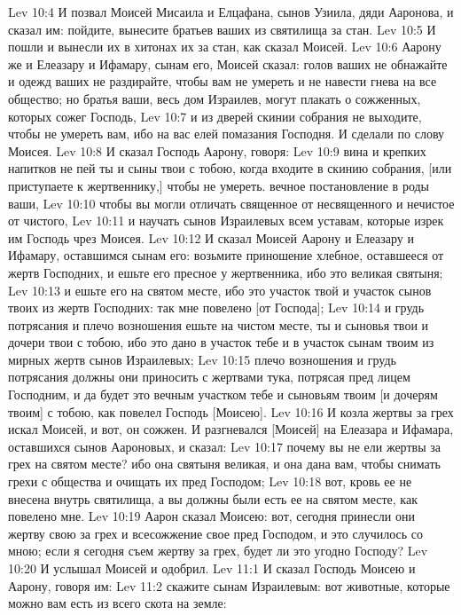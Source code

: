 \vs Lev 10:4 И позвал Моисей Мисаила и Елцафана, сынов Узиила, дяди Ааронова, и сказал им: пойдите, вынесите братьев ваших из святилища за стан.
\vs Lev 10:5 И пошли и вынесли их в хитонах их за стан, как сказал Моисей.
\vs Lev 10:6 Аарону же и Елеазару и Ифамару, сынам его, Моисей сказал: голов ваших не обнажайте и одежд ваших не раздирайте, чтобы вам не умереть и не навести гнева на все общество; но братья ваши, весь дом Израилев, могут плакать о сожженных, которых сожег Господь,
\vs Lev 10:7 и из дверей скинии собрания не выходите, чтобы не умереть вам, ибо на вас елей помазания Господня. И сделали по слову Моисея.
\rsbpar\vs Lev 10:8 И сказал Господь Аарону, говоря:
\vs Lev 10:9 вина и крепких напитков не пей ты и сыны твои с тобою, когда входите в скинию собрания, [или приступаете к жертвеннику,] чтобы не умереть.  вечное постановление в роды ваши,
\vs Lev 10:10 чтобы вы могли отличать священное от несвященного и нечистое от чистого,
\vs Lev 10:11 и научать сынов Израилевых всем уставам, которые изрек им Господь чрез Моисея.
\rsbpar\vs Lev 10:12 И сказал Моисей Аарону и Елеазару и Ифамару, оставшимся сынам его: возьмите приношение хлебное, оставшееся от жертв Господних, и ешьте его пресное у жертвенника, ибо это великая святыня;
\vs Lev 10:13 и ешьте его на святом месте, ибо это участок твой и участок сынов твоих из жертв Господних: так мне повелено [от Господа];
\vs Lev 10:14 и грудь потрясания и плечо возношения ешьте на чистом месте, ты и сыновья твои и дочери твои с тобою, ибо это дано в участок тебе и в участок сынам твоим из мирных жертв сынов Израилевых;
\vs Lev 10:15 плечо возношения и грудь потрясания должны они приносить с жертвами тука, потрясая пред лицем Господним, и да будет это вечным участком тебе и сыновьям твоим [и дочерям твоим] с тобою, как повелел Господь [Моисею].
\vs Lev 10:16 И козла жертвы за грех искал Моисей, и вот, он сожжен. И разгневался [Моисей] на Елеазара и Ифамара, оставшихся сынов Аароновых, и сказал:
\vs Lev 10:17 почему вы не ели жертвы за грех на святом месте? ибо она святыня великая, и она дана вам, чтобы снимать грехи с общества и очищать их пред Господом;
\vs Lev 10:18 вот, кровь ее не внесена внутрь святилища, а вы должны были есть ее на святом месте, как повелено мне.
\vs Lev 10:19 Аарон сказал Моисею: вот, сегодня принесли они жертву свою за грех и всесожжение свое пред Господом, и это случилось со мною; если я сегодня съем жертву за грех, будет ли это угодно Господу?
\vs Lev 10:20 И услышал Моисей и одобрил.
\vs Lev 11:1 И сказал Господь Моисею и Аарону, говоря им:
\vs Lev 11:2 скажите сынам Израилевым: вот животные, которые можно вам есть из всего скота на земле:
